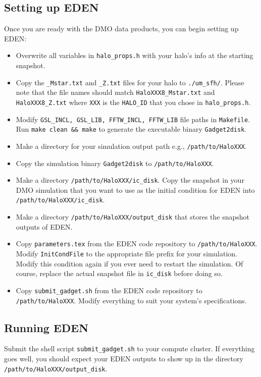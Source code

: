 \documentclass[12pt]{article}
\begin{document}
    \subsection{Setting up EDEN}
    Once you are ready with the DMO data products, you can begin setting up EDEN:
    \begin{itemize}
        \item Overwrite all variables in \texttt{halo\_props.h} with your halo's info at the starting snapshot.
        \item Copy the \texttt{\_Mstar.txt} and \texttt{\_Z.txt} files for your halo to \texttt{./um\_sfh/}. Please note that the file names should match \texttt{HaloXXX8\_Mstar.txt} and \texttt{HaloXXX8\_Z.txt} where \texttt{XXX} is the \texttt{HALO\_ID} that you chose in \texttt{halo\_props.h}.
        \item Modify \texttt{GSL\_INCL, GSL\_LIB, FFTW\_INCL, FFTW\_LIB} file paths in \texttt{Makefile}. Run \texttt{make clean \&\& make} to generate the executable binary \texttt{Gadget2disk}.
        \item Make a directory for your simulation output path e.g., \texttt{/path/to/HaloXXX}.
        \item Copy the simulation binary \texttt{Gadget2disk} to \texttt{/path/to/HaloXXX}.
        \item Make a directory \texttt{/path/to/HaloXXX/ic\_disk}. Copy the snapshot in your DMO simulation that you want to use as the initial condition for EDEN into \texttt{/path/to/HaloXXX/ic\_disk}.
        \item Make a directory \texttt{/path/to/HaloXXX/output\_disk} that stores the snapshot outputs of EDEN.
        \item Copy \texttt{parameters.tex} from the EDEN code repository to \texttt{/path/to/HaloXXX}. Modify \texttt{InitCondFile} to the appropriate file prefix for your simulation. Modify this condition again if you ever need to restart the simulation. Of course, replace the actual snapshot file in \texttt{ic\_disk} before doing so.
        \item Copy \texttt{submit\_gadget.sh} from the EDEN code repository to \texttt{/path/to/HaloXXX}. Modify everything to suit your system's specifications.
    \end{itemize}

    \subsection{Running EDEN}
    Submit the shell script \texttt{submit\_gadget.sh} to your compute cluster. If everything goes well, you should expect your EDEN outputs to show up in the directory \texttt{/path/to/HaloXXX/output\_disk}.
\end{document}
